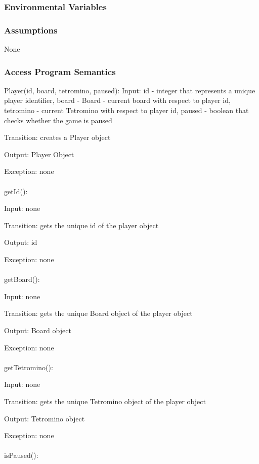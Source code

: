 \documentclass[12,english]{article}
\begin{document}
			
			\subsubsection{Environmental Variables}

			
			\subsubsection{Assumptions}
			None
			
			\subsubsection{Access Program Semantics}
			
			Player(id, board, tetromino, paused):
			Input: id - integer that represents a unique player identifier, board - Board - current board with respect to player id,
			tetromino - current Tetromino with respect to player id, paused - boolean that checks whether the game is paused
			
			Transition: creates a Player  object
		
			Output: Player Object
			
			Exception: none\\
			\\
			getId():
			
			Input: none
			
			Transition: gets the unique id of the player object 
			
			Output: id 
			
			Exception: none\\
	        \\			
			getBoard():
			
			Input: none
			
			Transition:  gets the unique Board object of the player object 
			
			Output: Board object
			
			Exception: none\\
			\\			
			getTetromino():
			
			Input: none
			
			Transition:  gets the unique Tetromino object of the player object 
			
			Output: Tetromino object
			
			Exception: none\\
			\\					
			isPaused():
			
\end{document}
